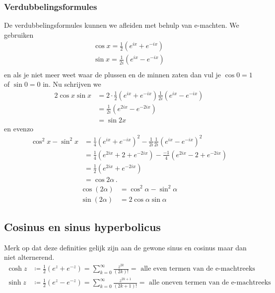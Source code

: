 \subsubsection{Verdubbelingsformules}
De verdubbelingsformules kunnen we afleiden met behulp van e-machten.
We gebruiken
\begin{align*}
	\cos x = \frac 1 2 \left( e^{ix} + e^{-ix} \right) \\
	\sin x = \frac 1 {2i} \left( e^{ix} - e^{-ix} \right) \\
\end{align*}
en als je niet meer weet waar de plussen en de minnen zaten dan vul je $\cos 0 = 1$ of $\sin 0 = 0$ in.
Nu schrijven we
\begin{align*}
	2 \cos x \sin x &= 2 \cdot \frac 1 2 \left( e^{i x} + e^{-ix} \right) \frac 1 {2i} \left( e^{ix} - e^{-ix} \right) \\
	&= \frac 1 {2i} \left(e^{2 i x} - e^{-2ix} \right) \\
	&= \sin 2 x
\end{align*}
en evenzo
\begin{align*}
	\cos^2 x - \sin^2 x &= \frac 1 4 \left( e^{ix} + e^{-ix} \right)^2  - \frac 1 {2i} \frac 1 {2i} \left( e^{ix} - e^{-ix} \right)^2 \\
	&= \frac 1 4 \left( e^{2ix} + 2 + e^{-2ix} \right) - \frac {-1} {4} \left( e^{2ix} - 2 + e^{-2ix} \right) \\
	&= \frac {1} {2} \left( e^{2ix} + e^{-2ix} \right) \\
	&= \cos 2\alpha \,.
\end{align*}
\begin{align*}
	\cos (2\alpha) &= \cos^2 \alpha - \sin^2 \alpha \\
	\sin (2\alpha) &= 2 \cos \alpha \sin \alpha
\end{align*}
\subsection{Cosinus en sinus hyperbolicus}\label{subsec:cosinusEnSinusHyperbolicus}
Merk op dat deze definities gelijk zijn aan de gewone sinus en cosinus maar dan niet alternerend.
\begin{align*}
	\cosh z &\coloneqq \frac{1}{2} (e^z + e^{-z}) = \sum_{k=0}^\infty \frac{z^{2k}}{(2k)!} = \text{ alle even termen van de e-machtreeks} \\
	\sinh z &\coloneqq \frac{1}{2} (e^z - e^{-z}) = \sum_{k=0}^\infty \frac{z^{2k+1}}{(2k+1)!} = \text{ alle oneven termen van de e-machtreeks}
\end{align*}
